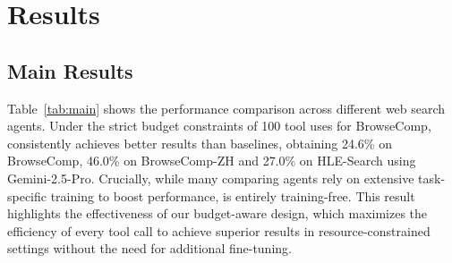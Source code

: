 \section{Results}

\subsection{Main Results}

Table~\ref{tab:main} shows the performance comparison across different web search agents. 
Under the strict budget constraints of 100 tool uses for BrowseComp, \method consistently achieves better results than baselines, obtaining 24.6\% on BrowseComp, 46.0\% on BrowseComp-ZH and 27.0\% on HLE-Search using Gemini-2.5-Pro. Crucially, while many comparing agents rely on extensive task-specific training to boost performance, \method is entirely training-free. This result highlights the effectiveness of our budget-aware design, which maximizes the efficiency of every tool call to achieve superior results in resource-constrained settings without the need for additional fine-tuning.



